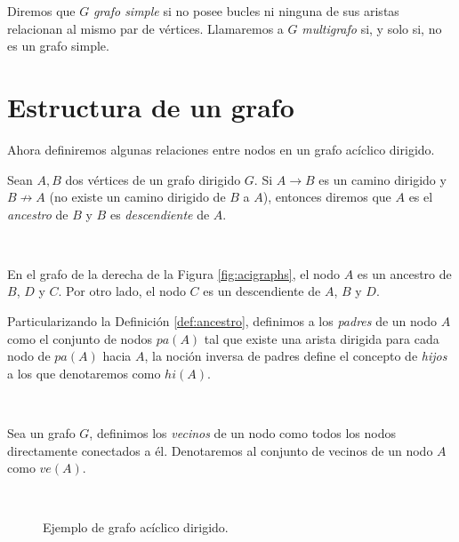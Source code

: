 \documentclass[oneside,openright,titlepage,numbers=noenddot,openany,headinclude,footinclude=true,
cleardoublepage=empty,abstractoff,BCOR=5mm,paper=a4,fontsize=12pt,main=spanish]{scrreprt}
\begin{document}
\begin{definition}
Diremos que $G$ \textit{grafo simple} si no posee bucles ni ninguna de sus aristas relacionan al mismo par de vértices. Llamaremos a $G$ \textit{multigrafo} si, y solo si, no es un grafo simple.
\end{definition}

\section{Estructura de un grafo}

Ahora definiremos algunas relaciones entre nodos en un grafo acíclico dirigido.\\

\begin{definition} \label{def:ancestro}
Sean $A,B$ dos vértices de un grafo dirigido $G$. Si $A \to B$ es un camino dirigido y $B \not \to A$ (no existe un camino dirigido de $B$ a $A$), entonces diremos que $A$ es el \textit{ancestro} de $B$ y $B$ es \textit{descendiente} de $A$.
\end{definition}\

\begin{example}
En el grafo de la derecha de la Figura \ref{fig:acigraphs}, el nodo $A$ es un ancestro de  $B$, $D$ y $C$. Por otro lado, el nodo $C$ es un descendiente de $A$, $B$ y $D$.
\end{example}

\clearpage

\begin{definition}
Particularizando la Definición \ref{def:ancestro}, definimos a los \textit{padres} de un nodo $A$ como el conjunto de nodos $pa(A)$ tal que existe una arista dirigida para cada nodo de $pa(A)$ hacia $A$, la noción inversa de padres define el concepto de \textit{hijos} a los que denotaremos como $hi(A)$.
\end{definition}\

\begin{definition}
Sea un grafo $G$, definimos los \textit{vecinos} de un nodo como todos los nodos directamente conectados a él. Denotaremos al conjunto de vecinos de un nodo $A$ como $ve(A)$.
\end{definition}\

\begin{figure}[h]
\centering
{}
\caption{Ejemplo de grafo acíclico dirigido.}
\label{fig:relations}
\end{figure}
\end{document}
